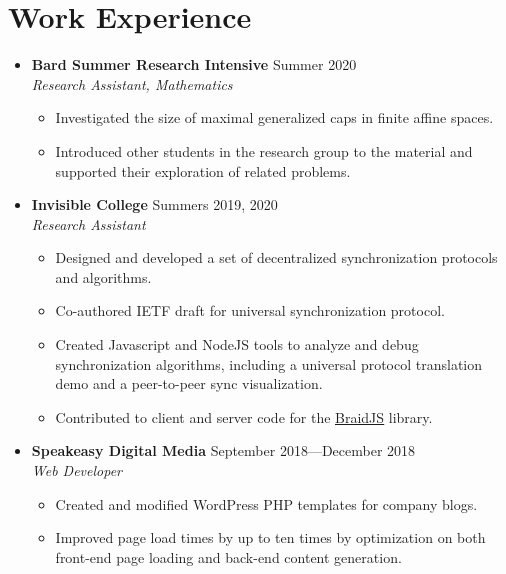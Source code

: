 \documentclass[12pt,letterpaper]{article}
\newenvironment{explist}
{\begin{itemize}[label=\textbf{--},itemsep=1pt,topsep=0pt,partopsep=0pt,parsep=0pt]}
{\end{itemize}}
\begin{document}
\section*{Work Experience} \vspace{-0.5em}
\begin{itemize}[label=,itemsep=0pt]
    \item
    \textbf{Bard Summer Research Intensive} \hfill Summer 2020\\
    \textit{Research Assistant, Mathematics}
    \begin{explist}
        \item Investigated the size of maximal generalized caps in finite affine spaces.
        \item Introduced other students in the research group to the material and supported their exploration of related problems.
    \end{explist}
	\item 
	\textbf{Invisible College} \hfill Summers 2019, 2020\\
	\textit{Research Assistant}
	\begin{explist}
		\item Designed and developed a set of decentralized synchronization protocols and algorithms.
		\item Co-authored IETF draft for universal synchronization protocol.
		\item Created Javascript and NodeJS tools to analyze and debug synchronization algorithms, including a universal protocol translation demo and a peer-to-peer sync visualization.
        \item Contributed to client and server code for the \underline{\href{https://github.com/braid-work/braidjs}{BraidJS}} library.
	\end{explist}

	\item
	\textbf{Speakeasy Digital Media} \hfill September 2018---December 2018\\
	\textit{Web Developer}
	\begin{explist}
		\item Created and modified WordPress PHP templates for company blogs.
		\item Improved page load times by up to ten times by optimization on both front-end page loading and back-end content generation.
	\end{explist}
	

\end{itemize}
\end{document}
